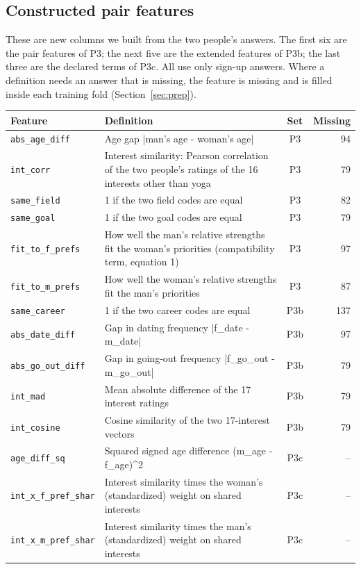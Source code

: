 \documentclass[11pt]{article}
\begin{document}
\subsection{Constructed pair features}

These are new columns we built from the two people's answers. The first six are the pair features of P3; the next five are the extended features of P3b; the last three are the declared terms of P3c. All use only sign-up answers. Where a definition needs an answer that is missing, the feature is missing and is filled inside each training fold (Section~\ref{sec:prep}).

\small
\begin{center}
\begin{tabular}{L{3.4cm}L{9.2cm}cr}
\toprule
\textbf{Feature} & \textbf{Definition} & \textbf{Set} & \textbf{Missing} \\
\midrule
\texttt{abs\_age\_diff} & Age gap |man's age - woman's age| & P3 & 94 \\
\texttt{int\_corr} & Interest similarity: Pearson correlation of the two people's ratings of the 16 interests other than yoga & P3 & 79 \\
\texttt{same\_field} & 1 if the two field codes are equal & P3 & 82 \\
\texttt{same\_goal} & 1 if the two goal codes are equal & P3 & 79 \\
\texttt{fit\_to\_f\_prefs} & How well the man's relative strengths fit the woman's priorities (compatibility term, equation 1) & P3 & 97 \\
\texttt{fit\_to\_m\_prefs} & How well the woman's relative strengths fit the man's priorities & P3 & 87 \\
\texttt{same\_career} & 1 if the two career codes are equal & P3b & 137 \\
\texttt{abs\_date\_diff} & Gap in dating frequency |f\_date - m\_date| & P3b & 97 \\
\texttt{abs\_go\_out\_diff} & Gap in going-out frequency |f\_go\_out - m\_go\_out| & P3b & 79 \\
\texttt{int\_mad} & Mean absolute difference of the 17 interest ratings & P3b & 79 \\
\texttt{int\_cosine} & Cosine similarity of the two 17-interest vectors & P3b & 79 \\
\texttt{age\_diff\_sq} & Squared signed age difference (m\_age - f\_age)\textasciicircum{}2 & P3c & -- \\
\texttt{int\_x\_f\_pref\_shar} & Interest similarity times the woman's (standardized) weight on shared interests & P3c & -- \\
\texttt{int\_x\_m\_pref\_shar} & Interest similarity times the man's (standardized) weight on shared interests & P3c & -- \\
\bottomrule
\end{tabular}
\end{center}
\par\medskip
\normalsize
\end{document}
